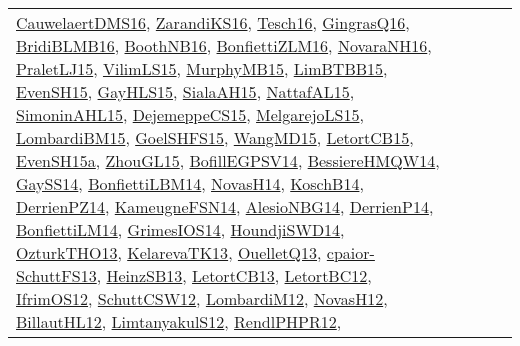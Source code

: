 {\begin{longtable}{lp{3cm}>{\raggedright}p{6cm}>{\raggedright}p{6cm}p{8cm}}
\href{papers/CauwelaertDMS16.pdf}{CauwelaertDMS16}\cite{CauwelaertDMS16}, \href{articles/ZarandiKS16.pdf}{ZarandiKS16}\cite{ZarandiKS16}, \href{papers/Tesch16.pdf}{Tesch16}\cite{Tesch16}, \href{papers/GingrasQ16.pdf}{GingrasQ16}\cite{GingrasQ16}, \href{articles/BridiBLMB16.pdf}{BridiBLMB16}\cite{BridiBLMB16}, \href{papers/BoothNB16.pdf}{BoothNB16}\cite{BoothNB16}, \href{papers/BonfiettiZLM16.pdf}{BonfiettiZLM16}\cite{BonfiettiZLM16}, \href{articles/NovaraNH16.pdf}{NovaraNH16}\cite{NovaraNH16}, \href{papers/PraletLJ15.pdf}{PraletLJ15}\cite{PraletLJ15}, \href{papers/VilimLS15.pdf}{VilimLS15}\cite{VilimLS15}, \href{papers/MurphyMB15.pdf}{MurphyMB15}\cite{MurphyMB15}, \href{papers/LimBTBB15.pdf}{LimBTBB15}\cite{LimBTBB15}, \href{papers/EvenSH15.pdf}{EvenSH15}\cite{EvenSH15}, \href{papers/GayHLS15.pdf}{GayHLS15}\cite{GayHLS15}, \href{papers/SialaAH15.pdf}{SialaAH15}\cite{SialaAH15}, \href{articles/NattafAL15.pdf}{NattafAL15}\cite{NattafAL15}, \href{articles/SimoninAHL15.pdf}{SimoninAHL15}\cite{SimoninAHL15}, \href{papers/DejemeppeCS15.pdf}{DejemeppeCS15}\cite{DejemeppeCS15}, \href{papers/MelgarejoLS15.pdf}{MelgarejoLS15}\cite{MelgarejoLS15}, \href{papers/LombardiBM15.pdf}{LombardiBM15}\cite{LombardiBM15}, \href{articles/GoelSHFS15.pdf}{GoelSHFS15}\cite{GoelSHFS15}, \href{articles/WangMD15.pdf}{WangMD15}\cite{WangMD15}, \href{articles/LetortCB15.pdf}{LetortCB15}\cite{LetortCB15}, \href{articles/EvenSH15a.pdf}{EvenSH15a}\cite{EvenSH15a}, \href{papers/ZhouGL15.pdf}{ZhouGL15}\cite{ZhouGL15}, \href{papers/BofillEGPSV14.pdf}{BofillEGPSV14}\cite{BofillEGPSV14}, \href{papers/BessiereHMQW14.pdf}{BessiereHMQW14}\cite{BessiereHMQW14}, \href{papers/GaySS14.pdf}{GaySS14}\cite{GaySS14}, \href{articles/BonfiettiLBM14.pdf}{BonfiettiLBM14}\cite{BonfiettiLBM14}, \href{articles/NovasH14.pdf}{NovasH14}\cite{NovasH14}, \href{papers/KoschB14.pdf}{KoschB14}\cite{KoschB14}, \href{papers/DerrienPZ14.pdf}{DerrienPZ14}\cite{DerrienPZ14}, \href{articles/KameugneFSN14.pdf}{KameugneFSN14}\cite{KameugneFSN14}, \href{papers/AlesioNBG14.pdf}{AlesioNBG14}\cite{AlesioNBG14}, \href{papers/DerrienP14.pdf}{DerrienP14}\cite{DerrienP14}, \href{papers/BonfiettiLM14.pdf}{BonfiettiLM14}\cite{BonfiettiLM14}, \href{articles/GrimesIOS14.pdf}{GrimesIOS14}\cite{GrimesIOS14}, \href{papers/HoundjiSWD14.pdf}{HoundjiSWD14}\cite{HoundjiSWD14}, \href{articles/OzturkTHO13.pdf}{OzturkTHO13}\cite{OzturkTHO13}, \href{papers/KelarevaTK13.pdf}{KelarevaTK13}\cite{KelarevaTK13}, \href{papers/OuelletQ13.pdf}{OuelletQ13}\cite{OuelletQ13}, \href{papers/cpaior-SchuttFS13.pdf}{cpaior-SchuttFS13}\cite{cpaior-SchuttFS13}, \href{articles/HeinzSB13.pdf}{HeinzSB13}\cite{HeinzSB13}, \href{papers/LetortCB13.pdf}{LetortCB13}\cite{LetortCB13}, \href{papers/LetortBC12.pdf}{LetortBC12}\cite{LetortBC12}, \href{papers/IfrimOS12.pdf}{IfrimOS12}\cite{IfrimOS12}, \href{papers/SchuttCSW12.pdf}{SchuttCSW12}\cite{SchuttCSW12}, \href{articles/LombardiM12.pdf}{LombardiM12}\cite{LombardiM12}, \href{articles/NovasH12.pdf}{NovasH12}\cite{NovasH12}, \href{papers/BillautHL12.pdf}{BillautHL12}\cite{BillautHL12}, \href{articles/LimtanyakulS12.pdf}{LimtanyakulS12}\cite{LimtanyakulS12}, \href{papers/RendlPHPR12.pdf}{RendlPHPR12}\cite{RendlPHPR12}, 
\end{longtable}}
